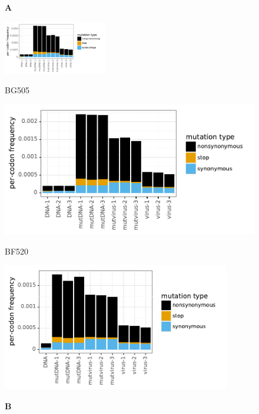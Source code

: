 \documentclass[9pt,lineno]{elife}
\begin{document}
\begin{figure}
\begin{minipage}[t]{0.34\textwidth}
{\bf \Large A} \\ 
\centerline{{\includegraphics[clip=true, trim=4.3in 1.4in 0in 0.48in, width=0.4\textwidth]{figures/BG505_avgmutfreqs.pdf}}} 
\centerline{\small BG505}
\includegraphics[clip=true, trim=0in 0in 1.7in 0in, width=\textwidth]{figures/BG505_avgmutfreqs.pdf}
\centerline{\small BF520}
\includegraphics[clip=true, trim=0in 0in 1.7in 0in, width=0.89\textwidth]{figures/BF520_avgmutfreqs.pdf}
\end{minipage}
\begin{minipage}[t]{0.01\textwidth}
\end{minipage}
\begin{minipage}[t]{0.65\textwidth}
{\bf \Large B} \\

\end{minipage}
\end{figure}
\end{document}
